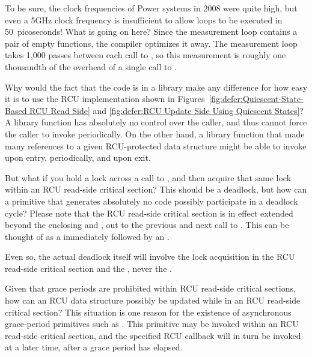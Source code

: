 \begin{enumerate}
\QuickQ{}
	To be sure, the clock frequencies of Power
	systems in 2008 were quite high, but even a 5GHz clock
	frequency is insufficient to allow
	loops to be executed in 50~picoseconds!
	What is going on here?
\QuickA{}
	Since the measurement loop contains a pair of empty functions,
	the compiler optimizes it away.
	The measurement loop takes 1,000 passes between each call to
	, so this measurement is roughly
	one thousandth of the overhead of a single call to
	.

\QuickQ{}
	Why would the fact that the code is in a library make
	any difference for how easy it is to use the RCU
	implementation shown in
	Figures~\ref{fig:defer:Quiescent-State-Based RCU Read Side} and
	\ref{fig:defer:RCU Update Side Using Quiescent States}?
\QuickA{}
	A library function has absolutely no control over the caller,
	and thus cannot force the caller to invoke 
	periodically.
	On the other hand, a library function that made many references
	to a given RCU-protected data structure might be able to invoke
	 upon entry,
	 periodically, and
	 upon exit.

\QuickQ{}
	But what if you hold a lock across a call to
	, and then acquire that same lock within
	an RCU read-side critical section?
	This should be a deadlock, but how can a primitive that
	generates absolutely no code possibly participate in a
	deadlock cycle?
\QuickA{}
	Please note that the RCU read-side critical section is in
	effect extended beyond the enclosing
	 and , out to
	the previous and next call to .
	This  can be thought of as a
	 immediately followed by an
	.

	Even so, the actual deadlock itself will involve the lock
	acquisition in the RCU read-side critical section and
	the , never the .

\QuickQ{}
	Given that grace periods are prohibited within RCU read-side
	critical sections, how can an RCU data structure possibly be
	updated while in an RCU read-side critical section?
\QuickA{}
	This situation is one reason for the existence of asynchronous
	grace-period primitives such as .
	This primitive may be invoked within an RCU read-side critical
	section, and the specified RCU callback will in turn be invoked
	at a later time, after a grace period has elapsed.


\end{enumerate}
